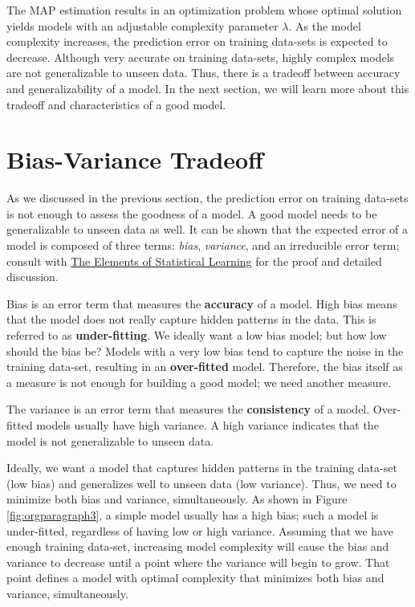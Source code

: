 \documentclass[11pt]{article}
\begin{document}
The MAP estimation results in an optimization problem whose optimal solution yields models with an adjustable complexity parameter \(\lambda\). As the model complexity increases, the prediction error on training data-sets is expected to decrease. Although very accurate on training data-sets, highly complex models are not generalizable to unseen data. Thus, there is a tradeoff between accuracy and generalizability of a model. In the next section, we will learn more about this tradeoff and characteristics of a good model.

\section{\label{orgtarget2} Bias-Variance Tradeoff}
\label{sec:orgheadline7}
As we discussed in the previous section, the prediction error on training data-sets is not enough to assess the goodness of a model. A good model needs to be generalizable to unseen data as well. It can be shown that the expected error of a model is composed of three terms: \emph{bias}, \emph{variance}, and an irreducible error term; consult with \href{https://web.stanford.edu/~hastie/ElemStatLearn/}{The Elements of Statistical Learning} for the proof and detailed discussion.

Bias is an error term that measures the \textbf{accuracy} of a model. High bias means that the model does not really capture hidden patterns in the data. This is referred to as \textbf{under-fitting}. We ideally want a low bias model; but how low should the bias be? Models with a very low bias tend to capture the noise in the training data-set, resulting in an \textbf{over-fitted} model. Therefore, the bias itself as a measure is not enough for building a good model; we need another measure.

The variance is an error term that measures the \textbf{consistency} of a model. Over-fitted models usually have high variance. A high variance indicates that the model is not generalizable to unseen data.

Ideally, we want a model that captures hidden patterns in the training data-set (low bias) and generalizes well to unseen data (low variance). Thus, we need to minimize both bias and variance, simultaneously. As shown in Figure \ref{fig:orgparagraph3}, a simple model usually has a high bias; such a model is under-fitted, regardless of having low or high variance. Assuming that we have enough training data-set, increasing model complexity will cause the bias and variance to decrease until a point where the variance will begin to grow. That point defines a model with optimal complexity that minimizes both bias and variance, simultaneously.
\end{document}
